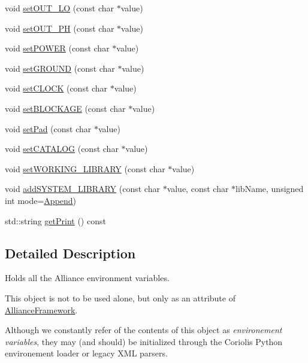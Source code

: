 \begin{DoxyCompactItemize}
void \hyperlink{classCRL_1_1Environment_a57a42a469f6cf94ba39e5b7aacfa738c}{set\-O\-U\-T\-\_\-\-L\-O} (const char $\ast$value)
\item 
void \hyperlink{classCRL_1_1Environment_a2785f1ae18e4293ce7e9e0bac791e495}{set\-O\-U\-T\-\_\-\-P\-H} (const char $\ast$value)
\item 
void \hyperlink{classCRL_1_1Environment_ae96c850eadc89d1705b9aa0256f434ea}{set\-P\-O\-W\-E\-R} (const char $\ast$value)
\item 
void \hyperlink{classCRL_1_1Environment_ac956b6814f89975563a3667945599fb2}{set\-G\-R\-O\-U\-N\-D} (const char $\ast$value)
\item 
void \hyperlink{classCRL_1_1Environment_a7ddc44d7f27745179c397445bce35c58}{set\-C\-L\-O\-C\-K} (const char $\ast$value)
\item 
void \hyperlink{classCRL_1_1Environment_af18cbbcdfb458b69dbb6de0dbb564a3a}{set\-B\-L\-O\-C\-K\-A\-G\-E} (const char $\ast$value)
\item 
void \hyperlink{classCRL_1_1Environment_a06c179d70d3065f0bfe398a02e4c6359}{set\-Pad} (const char $\ast$value)
\item 
void \hyperlink{classCRL_1_1Environment_a02b727f207875cebefbb59842c1efe70}{set\-C\-A\-T\-A\-L\-O\-G} (const char $\ast$value)
\item 
void \hyperlink{classCRL_1_1Environment_a315f5a14de9dc354cf81728adb29a8c6}{set\-W\-O\-R\-K\-I\-N\-G\-\_\-\-L\-I\-B\-R\-A\-R\-Y} (const char $\ast$value)
\item 
void \hyperlink{classCRL_1_1Environment_a7c3bff1fa3f9a080461950db36df4416}{add\-S\-Y\-S\-T\-E\-M\-\_\-\-L\-I\-B\-R\-A\-R\-Y} (const char $\ast$value, const char $\ast$lib\-Name, unsigned int mode=\hyperlink{classCRL_1_1Environment_ac5692c2f5d20e892573a3d46de222aeba69ce578d2eeb6a8de507920ccf673b8d}{Append})
\item 
std\-::string \hyperlink{classCRL_1_1Environment_a27c6a85b22ace1d2407e6cb75771cb32}{get\-Print} () const 
\end{DoxyCompactItemize}


\subsection{Detailed Description}
Holds all the Alliance environment variables. 

This object is not to be used alone, but only as an attribute of \hyperlink{classCRL_1_1AllianceFramework}{Alliance\-Framework}.

Although we constantly refer of the contents of this object as {\itshape environement variables}, they may (and should) be initialized through the Coriolis Python environement loader or legacy X\-M\-L parsers. 

